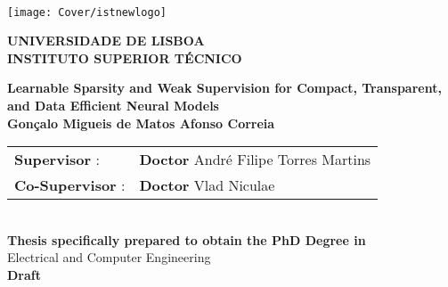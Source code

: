 \setcounter{page}{1} 


\thispagestyle{empty}
\begin{flushleft} ~\\ \vspace{-22mm} \hspace{-12mm}  \texttt{[image: Cover/istnewlogo]}

    \centering
    \Large \textbf{UNIVERSIDADE DE LISBOA \\ INSTITUTO SUPERIOR TÉCNICO}
    \vspace{30mm}

    \vspace{5mm}

    \centering
    \Large \textbf{Learnable Sparsity and Weak Supervision for Compact, Transparent, and Data Efficient Neural Models}
    \\ \vspace{25mm}  %
    \large \textbf{Gonçalo Migueis de Matos Afonso Correia} \\
    \vspace{4cm}

    \begin{minipage}{\textwidth}
        \begin{tabularx}{\textwidth}{ l @{ } l }
            \textbf{Supervisor} :    & \textbf{Doctor} André Filipe Torres Martins \\
            \textbf{Co-Supervisor} : & \textbf{Doctor} Vlad Niculae                \\
        \end{tabularx}
    \end{minipage}
    \\ \vspace{20mm}
    \centering
    \large \textbf{Thesis specifically prepared to obtain the PhD Degree in}\\
    \large Electrical and Computer Engineering\\
    \vspace{18mm}
    \Large \textbf{Draft}


\end{flushleft}
